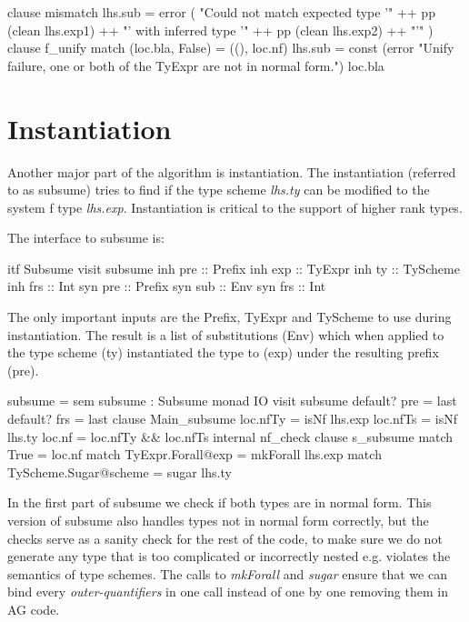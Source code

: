 \begin{code}
                     clause mismatch
                       lhs.sub = error (  "Could not match expected type '" 
                                        ++ pp (clean lhs.exp1) ++ "' with inferred type '" 
                                        ++ pp (clean lhs.exp2) ++ "'" )
                 clause f_unify
                   match (loc.bla, False) = ((), loc.nf)
                   lhs.sub = const (error "Unify failure, one or both of the TyExpr are not in normal form.") loc.bla
\end{code}

\section{Instantiation}
Another major part of the algorithm is instantiation. The instantiation (referred to as subsume) tries to find if the type scheme \emph{lhs.ty} can be modified to the system f type \emph{lhs.exp}. Instantiation is critical to the support of higher rank types.

The interface to subsume is:
\begin{code}
itf Subsume
  visit subsume
    inh pre  :: Prefix
    inh exp  :: TyExpr
    inh ty   :: TyScheme
    inh frs  :: Int
    syn pre  :: Prefix
    syn sub  :: Env
    syn frs  :: Int
\end{code}
The only important inputs are the Prefix, TyExpr and TyScheme to use during instantiation. The result is a list of substitutions (Env) which when applied to the type scheme (ty) instantiated the type to (exp) under the resulting prefix (pre).


\begin{code}
subsume = sem subsume : Subsume monad IO 
             visit subsume
               default? pre = last
               default? frs = last
               clause Main_subsume
                loc.nfTy = isNf lhs.exp
                loc.nfTs = isNf lhs.ty
                loc.nf   = loc.nfTy && loc.nfTs
                internal nf_check
                    clause s_subsume
                      match True                  = loc.nf
                      match TyExpr.Forall@exp     = mkForall lhs.exp
                      match TyScheme.Sugar@scheme = sugar lhs.ty
\end{code}
In the first part of subsume we check if both types are in normal form. This version of subsume also handles types not in normal form correctly, but the checks serve as a sanity check for the rest of the code, to make sure we do not generate any type that is too complicated or incorrectly nested e.g. violates the semantics of type schemes.
The calls to \emph{mkForall} and \emph{sugar} ensure that we can bind every \emph{outer-quantifiers} in one call instead of one by one removing them in AG code.

